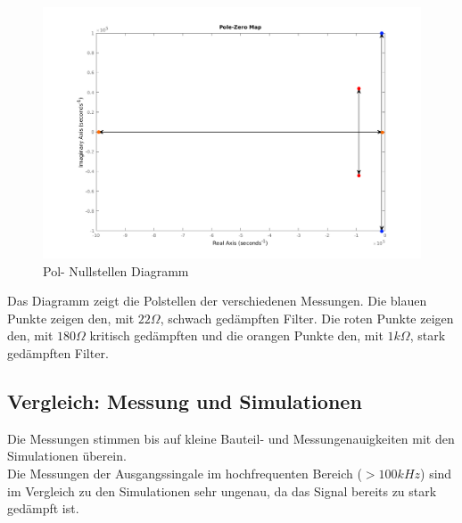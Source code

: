 \begin{figure}[H]
  \begin{center}
    \includegraphics[width=1\textwidth]{./PoleZeroMap.png}
    \caption{Pol- Nullstellen Diagramm}
  \end{center}
\end{figure}
\noindent
Das Diagramm zeigt die Polstellen der verschiedenen Messungen. Die blauen Punkte zeigen den, mit $22\Omega$, schwach gedämpften Filter. Die roten Punkte zeigen den, mit $180\Omega$ kritisch gedämpften und die 
orangen Punkte den, mit $1k\Omega$, stark gedämpften Filter.\\

\subsection{Vergleich: Messung und Simulationen}
Die Messungen stimmen bis auf kleine Bauteil- und Messungenauigkeiten mit den Simulationen \"uberein. \\
Die Messungen der Ausgangssingale im hochfrequenten Bereich ($>100kHz$) sind im Vergleich zu den Simulationen sehr ungenau, da das Signal bereits zu stark ged\"ampft ist. \newpage
